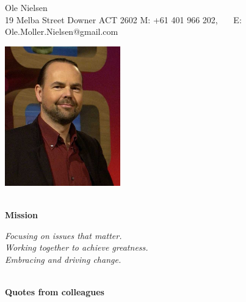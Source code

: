 \documentclass[11pt,a4paper]{article}
\begin{document}
\begin{center}
  Ole Nielsen \\
  19 Melba Street
  Downer ACT 2602
  M: +61 401 966 202, \ \ \ E: Ole.Moller.Nielsen@gmail.com
\end{center}
\begin{center}
\includegraphics[width=50mm,keepaspectratio=true]{ole.jpg}
\end{center}

\begin{center}
  \hrulefill \\
  {\bf Mission} \\[-0.2cm]
  \hrulefill
\end{center}

\begin{center}
\emph{Focusing on issues that matter.}\\
\emph{Working together to achieve greatness.}\\
\emph{Embracing and driving change.}
\end{center}

\begin{center}
  \hrulefill \\
  {\bf Quotes from colleagues} \\[-0.2cm]
  \hrulefill
\end{center}
\end{document}
